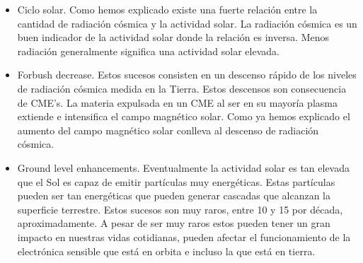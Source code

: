 \begin{itemize}
	\item	Ciclo solar. Como hemos explicado existe una fuerte relación entre la cantidad de radiación cósmica y la actividad solar. La radiación
		cósmica es un buen indicador de la actividad solar donde la relación es inversa. Menos radiación generalmente significa una actividad
		solar elevada.
	\item	Forbush decrease\cite{Forbush1938}. Estos sucesos consisten en un descenso rápido de los niveles de radiación cósmica medida en la
		Tierra. Estos descensos son consecuencia de CME's. La materia expulsada en un CME al ser en su mayoría plasma extiende e intensifica
		el campo magnético solar. Como ya hemos explicado el aumento del campo magnético solar conlleva al descenso de  radiación cósmica.
	\item	Ground level enhancements. Eventualmente la actividad solar es tan elevada que el Sol es capaz de emitir partículas muy energéticas.
		Estas partículas pueden ser tan energéticas que pueden generar cascadas que alcanzan la superficie terrestre.  Estos sucesos son muy
		raros, entre 10 y 15 por década, aproximadamente. A pesar de ser muy raros estos pueden tener un gran impacto en nuestras vidas
		cotidianas, pueden afectar el funcionamiento de la electrónica sensible que está en orbita e incluso la que está en tierra.   
\end{itemize}

